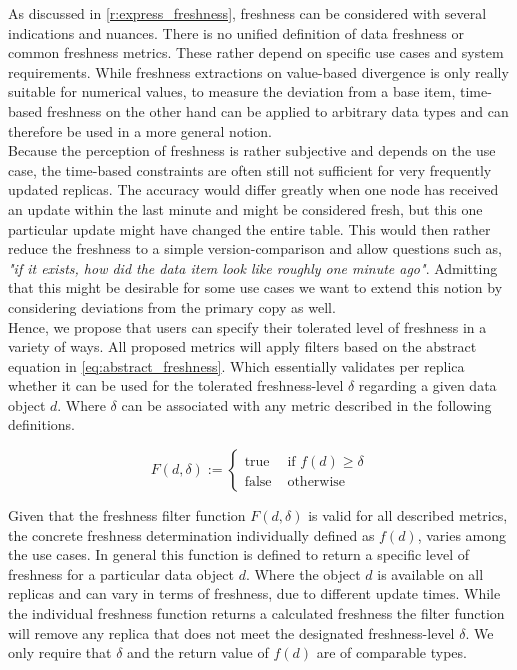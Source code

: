 As discussed in \ref{r:express_freshness}, freshness can be considered with several indications and nuances.
There is no unified definition of data freshness or common freshness metrics.
These rather depend on specific use cases and system requirements.
While freshness extractions on value-based divergence is only really suitable for numerical values,
to measure the deviation from a base item, time-based freshness on the other hand can be applied to arbitrary data types and can therefore be used 
in a more general notion.\\
Because the perception of freshness is rather subjective and depends on the use case, the time-based constraints are often still not sufficient for very frequently
updated replicas.
The accuracy would differ greatly when one node has received an update within the last minute and might be considered fresh, but this one particular 
update might have changed the entire table. 
This would then rather reduce the freshness to a simple version-comparison and allow questions such as, \textit{"if it exists, how did the data item look like roughly one minute ago"}.
Admitting that this might be desirable for some use cases we want to extend this notion by considering deviations from the primary copy as well.\\

Hence, we propose that users can specify their tolerated level of freshness in a variety of ways. 
All proposed metrics will apply filters based on the abstract equation in \ref{eq:abstract_freshness}. 
Which essentially validates per replica whether it can be used for the tolerated freshness-level $\delta$ regarding a given data object $d$.
Where $\delta$ can be associated with any metric described in the following definitions.

\begin{equation} \label{eq:abstract_freshness}
    F(d, \delta) :=
        \begin{cases}
            \text{true } & \text{if } f(d) \geq \delta\\
            \text{false } & \text{otherwise }
        \end{cases}
\end{equation}


Given that the freshness filter function $F(d, \delta)$ is valid for all described metrics, the concrete freshness determination individually defined as $f(d)$, 
varies among the use cases.
In general this function is defined to return a specific level of freshness for a particular data object $d$. 
Where the object $d$ is available on all replicas and can vary in terms of freshness, due to different update times.
While the individual freshness function returns a calculated freshness the filter function will remove any replica that does not meet the designated freshness-level $\delta$. 
We only require that $\delta$ and the return value of $f(d)$ are of comparable types.


